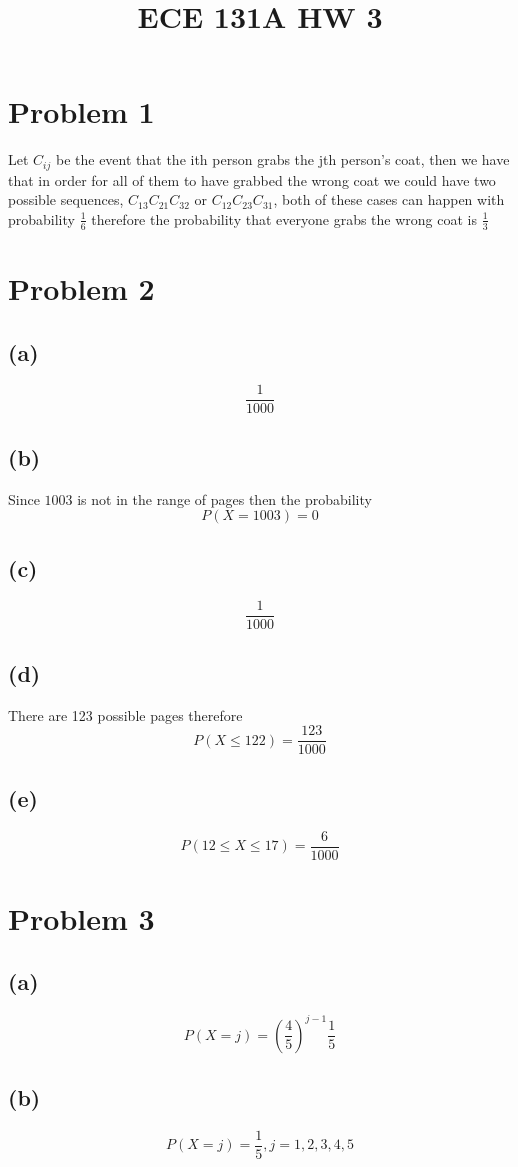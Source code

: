 
\title{ECE 131A HW 3}

\maketitle
\section*{Problem 1}
Let $C_{ij}$ be the event that 
the ith person grabs the jth person's coat, then we have that 
in order for all of them to have grabbed the wrong coat we could
have two possible sequences, 
$C_{13}C_{21}C_{32}$ or $C_{12}C_{23}C_{31}$, both of these cases
can happen with probability $\frac{1}{6}$ therefore the probability
that everyone grabs the wrong coat is $\boxed{\frac{1}{3}}$
\section*{Problem 2}
\subsection*{(a)}
$$\boxed{\frac{1}{1000}}$$
\subsection*{(b)}
Since $1003$ is not in the range of pages
then the probability
$$P(X=1003)=\boxed{0}$$
\subsection*{(c)}
$$\boxed{\frac{1}{1000}}$$
\subsection*{(d)}
There are 123 possible pages
therefore
$$P(X\leq 122)=\boxed{\frac{123}{1000}}$$
\subsection*{(e)}
$$P(12\leq X\leq 17)=\boxed{\frac{6}{1000}}$$
\section*{Problem 3}
\subsection*{(a)}
$$P(X=j)=\left(\frac{4}{5}\right)^{j-1}\frac{1}{5}$$
\subsection*{(b)}
$$P(X=j)=\boxed{\frac{1}{5}, j=1,2,3,4,5}$$
